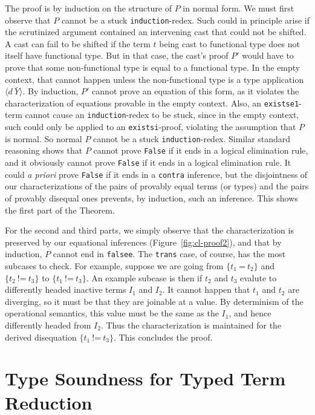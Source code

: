 \documentclass{fundam}
\newcommand{\Eq}[0]{\texttt{=}}
\newcommand{\Neq}[0]{\texttt{!=}}
\begin{document}
The proof is by induction on the structure of $P$ in normal form.  We
must first observe that $P$ cannot be a stuck
\texttt{induction}-redex.  Such could in principle arise if the
scrutinized argument contained an intervening cast that could not be
shifted.  A cast can fail to be shifted if the term $t$ being cast to
functional type does not itself have functional type.  But in that
case, the cast's proof $P'$ would have to prove that some
non-functional type is equal to a functional type.  In the empty
context, that cannot happen unless the non-functional type is a type
application $\langle d\ \bar{Y}\rangle$.  By induction, $P'$ cannot
prove an equation of this form, as it violates the characterization of
equations provable in the empty context.  Also, an
\texttt{existse1}-term cannot cause an \texttt{induction}-redex to be
stuck, since in the empty context, such could only be applied to an
\texttt{existsi}-proof, violating the assumption that $P$ is normal.
So normal $P$ cannot be a stuck \texttt{induction}-redex.  Similar
standard reasoning shows that $P$ cannot prove \texttt{False} if it
ends in a logical elimination rule, and it obviously cannot prove
\texttt{False} if it ends in a logical elimination rule.  It could
\emph{a priori} prove \texttt{False} if it ends in a \texttt{contra}
inference, but the disjointness of our characterizations of the pairs
of provably equal terms (or types) and the pairs of provably disequal
ones prevents, by induction, such an inference.  This shows the first
part of the Theorem.

For the second and third parts, we simply observe that the
characterization is preserved by our equational inferences
(Figure~\ref{fig:cl-proof2}), and that by induction, $P$ cannot end in
\texttt{falsee}.  The \texttt{trans} case, of course, has the most
subcases to check.  For example, suppose we are going from $\{ t_1\
\Eq\ t_2\}$ and $\{t_2\ \Neq\ t_3\}$ to $\{t_1\ \Neq\ t_3\}$.  An
example subcase is then if $t_2$ and $t_3$ evalute to differently
headed inactive terms $I_1$ and $I_2$.  It cannot happen that $t_1$
and $t_2$ are diverging, so it must be that they are joinable at a
value.  By determinism of the operational semantics, this value must
be the same as the $I_1$, and hence differently headed from $I_2$.
Thus the characterization is maintained for the derived disequation
$\{ t_1\ \Neq\ t_3\}$.  This concludes the proof.

\section{Type Soundness for Typed Term Reduction}
\label{sec:tp-sound}
\end{document}

